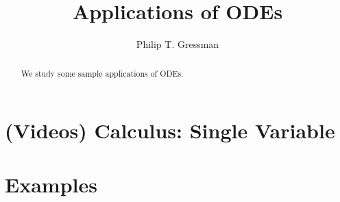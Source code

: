 \documentclass{ximera}
\title{Applications of ODEs}
\author{Philip T. Gressman}
\begin{document}
\begin{abstract}
We study some sample applications of ODEs.
\end{abstract}
\maketitle

\section*{(Videos) Calculus: Single Variable}

\section*{Examples}

\begin{example}

\end{example}

\begin{example}

\end{example}
\end{document}
